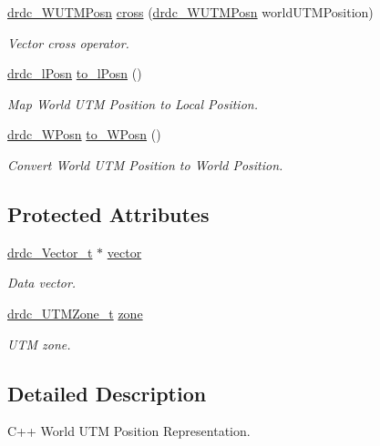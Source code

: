 \begin{CompactItemize}
\hyperlink{classdrdc__WUTMPosn}{drdc\_\-WUTMPosn} \hyperlink{classdrdc__WUTMPosn_4e5c3df2101517981b207471ad925105}{cross} (\hyperlink{classdrdc__WUTMPosn}{drdc\_\-WUTMPosn} worldUTMPosition)
\begin{CompactList}\small\item\em Vector cross operator. \item\end{CompactList}\item 
\hyperlink{classdrdc__lPosn}{drdc\_\-lPosn} \hyperlink{classdrdc__WUTMPosn_b678adb758987bd816743aef94f3d867}{to\_\-lPosn} ()
\begin{CompactList}\small\item\em Map World UTM Position to Local Position. \item\end{CompactList}\item 
\hyperlink{classdrdc__WPosn}{drdc\_\-WPosn} \hyperlink{classdrdc__WUTMPosn_17fe9ddb27cbf0bef977e716dafc92c0}{to\_\-WPosn} ()
\begin{CompactList}\small\item\em Convert World UTM Position to World Position. \item\end{CompactList}\end{CompactItemize}
\subsection*{Protected Attributes}
\begin{CompactItemize}
\item 
\hyperlink{structdrdc__Vector__t}{drdc\_\-Vector\_\-t} $\ast$ \hyperlink{classdrdc__WUTMPosn_5b083fd3680689ff552bdbff909f6a80}{vector}
\begin{CompactList}\small\item\em Data vector. \item\end{CompactList}\item 
\hyperlink{structdrdc__UTMZone__t}{drdc\_\-UTMZone\_\-t} \hyperlink{classdrdc__WUTMPosn_c00550c816a3939d62df40940763beed}{zone}
\begin{CompactList}\small\item\em UTM zone. \item\end{CompactList}\end{CompactItemize}


\subsection{Detailed Description}
C++ World UTM Position Representation. 



